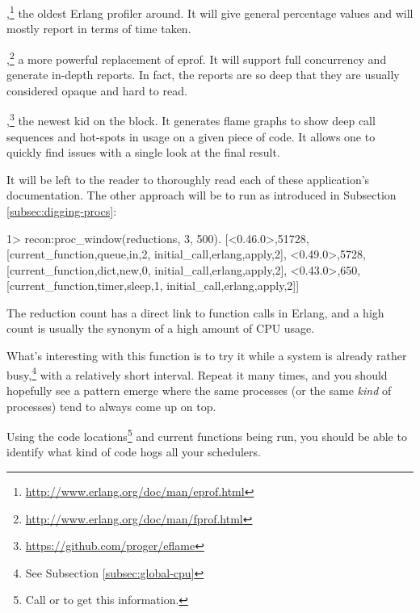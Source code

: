 \begin{itemize*}
	\item {},\footnote{\href{http://www.erlang.org/doc/man/eprof.html}{http://www.erlang.org/doc/man/eprof.html}} the oldest Erlang profiler around. It will give general percentage values and will mostly report in terms of time taken.
	\item {},\footnote{\href{http://www.erlang.org/doc/man/fprof.html}{http://www.erlang.org/doc/man/fprof.html}} a more powerful replacement of eprof. It will support full concurrency and generate in-depth reports. In fact, the reports are so deep that they are usually considered opaque and hard to read. 
	\item {},\footnote{\href{https://github.com/proger/eflame}{https://github.com/proger/eflame}} the newest kid on the block. It generates flame graphs to show deep call sequences and hot-spots in usage on a given piece of code. It allows one to quickly find issues with a single look at the final result.
\end{itemize*}

It will be left to the reader to thoroughly read each of these application's documentation. The other approach will be to run  as introduced in Subsection \ref{subsec:digging-procs}:

\begin{VerbatimEshell}
1> recon:proc_window(reductions, 3, 500).
[{<0.46.0>,51728,
  [{current_function,{queue,in,2}},
   {initial_call,{erlang,apply,2}}]},
 {<0.49.0>,5728,
  [{current_function,{dict,new,0}},
   {initial_call,{erlang,apply,2}}]},
 {<0.43.0>,650,
  [{current_function,{timer,sleep,1}},
   {initial_call,{erlang,apply,2}}]}]
\end{VerbatimEshell}

The reduction count has a direct link to function calls in Erlang, and a high count is usually the synonym of a high amount of CPU usage. 

What's interesting with this function is to try it while a system is already rather busy,\footnote{See Subsection \ref{subsec:global-cpu}} with a relatively short interval. Repeat it many times, and you should hopefully see a pattern emerge where the same processes (or the same \emph{kind} of processes) tend to always come up on top.

Using the code locations\footnote{Call  or  to get this information.} and current functions being run, you should be able to identify what kind of code hogs all your schedulers.

